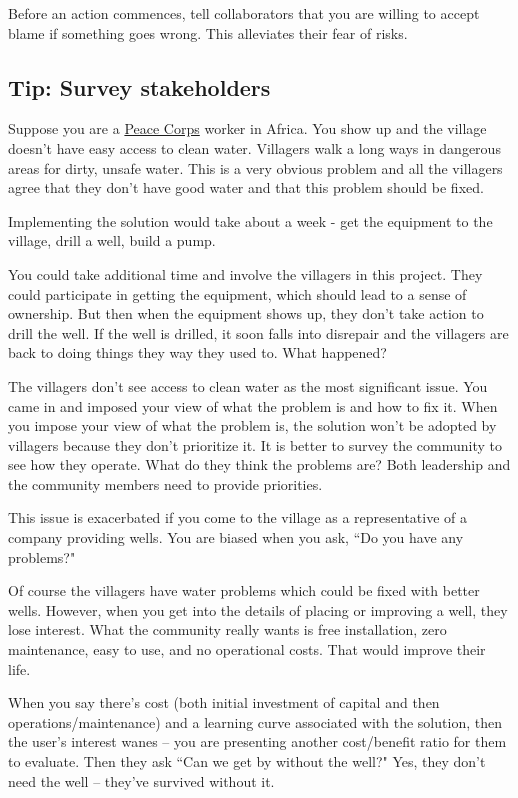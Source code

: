 Before an action commences, tell collaborators that you are willing to accept blame if something goes wrong. This alleviates their fear of risks.

\subsection*{Tip: Survey stakeholders}

Suppose you are a \href{http://www.peacecorps.gov/}{Peace Corps} worker in Africa. You show up and the village doesn't have easy access to clean water. Villagers walk a long ways in dangerous areas for dirty, unsafe water. This is a very obvious problem and all the villagers agree that they don't have good water and that this problem should be fixed.

Implementing the solution would take about a week - get the equipment to the village, drill a well, build a pump.

You could take additional time and involve the villagers in this project. They could participate in getting the equipment, which should lead to a sense of ownership.
But then when the equipment shows up, they don't take action to drill the well. If the well is drilled, it soon falls into disrepair and the villagers are back to doing things they way they used to. What happened?

The villagers don't see access to clean water as the most significant issue. You came in and imposed your view of what the problem is and how to fix it. When you impose your view of what the problem is, the solution won't be adopted by villagers because they don't prioritize it.
It is better to survey the community to see how they operate. What do they think the problems are?
Both leadership and the community members need to provide priorities.

This issue is exacerbated if you come to the village as a representative of a company providing wells. You are biased when you ask, ``Do you have any problems?"

Of course the villagers have water problems which could be fixed with better wells. However, when you get into the details of placing or improving a well, they lose interest. What the community really wants is free installation, zero maintenance, easy to use, and no operational costs. That would improve their life.

When you say there's cost (both initial investment of capital and then operations/maintenance) and a learning curve associated with the solution, then the user's interest wanes -- you are presenting another cost/benefit ratio for them to evaluate. Then they ask ``Can we get by without the well?" Yes, they don't need the well -- they've survived without it.

